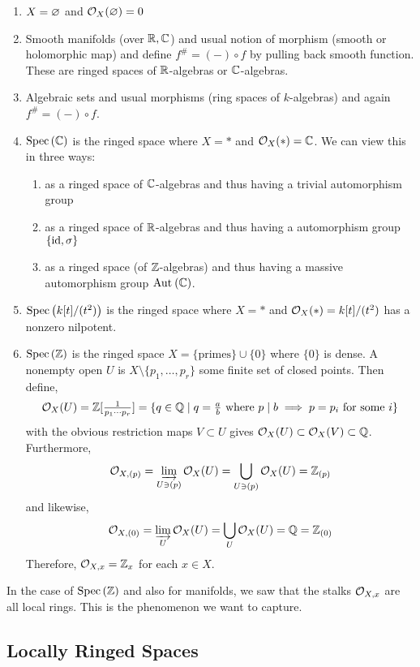 \documentclass[12pt]{article}
\begin{document}
\begin{enumerate}
\item $X = \varnothing$ and $\mathcal{O}_{X}(\varnothing) = 0$
\item Smooth manifolds (over $\mathbb{R}, \mathbb{C}$) and usual notion of morphism (smooth or holomorphic map) and define $f^\# = (-) \circ f$ by pulling back smooth function. These are ringed spaces of $\mathbb{R}$-algebras or $\mathbb{C}$-algebras.
\item Algebraic sets and usual morphisms (ring spaces of $k$-algebras) and again $f^\# = (-) \circ f$.
\item $\mathrm{Spec}\left( \mathbb{C} \right)$ is the ringed space where $X = *$ and $\mathcal{O}_{X}(*) = \mathbb{C}$. We can view this in three ways:
\begin{enumerate}
\item as a ringed space of $\mathbb{C}$-algebras and thus having a trivial automorphism group
\item as a ringed space of $\mathbb{R}$-algebras and thus having a automorphism group $\{ \mathrm{id}, \sigma \}$
\item as a ringed space (of $\mathbb{Z}$-algebras) and thus having a massive automorphism group $\mathrm{Aut}_{} \left( \mathbb{C} \right)$.
\end{enumerate}
\item $\mathrm{Spec}\left( k[t]/(t^2) \right)$ is the ringed space where $X = *$ and $\mathcal{O}_{X}(*) = k[t]/(t^2)$ has a nonzero nilpotent. 
\item $\mathrm{Spec}\left( \mathbb{Z} \right)$ is the ringed space $X = \{ \text{primes} \} \cup \{ 0 \}$ where $\{ 0 \}$ is dense. A nonempty open $U$ is $X \setminus \{ p_1, \dots, p_r \}$ some finite set of closed points. Then define,
\[ \mathcal{O}_{X}(U) = \mathbb{Z} [ \tfrac{1}{p_1 \cdots p_r} ] = \{ q \in \mathbb{Q} \mid q = \tfrac{a}{b} \text{ where } p \mid b \implies p = p_i \text{ for some } i \} \]
with the obvious restriction maps $V \subset U$ gives $\mathcal{O}_{X}(U) \subset \mathcal{O}_{X}(V) \subset \mathbb{Q}$. Furthermore,
\[ \mathcal{O}_{X, (p)} = \varinjlim_{U \ni (p)} \mathcal{O}_{X}(U) = \bigcup_{U \ni (p)} \mathcal{O}_{X}(U) = \mathbb{Z}_{(p)} \]
and likewise,
\[ \mathcal{O}_{X, (0)} = \varinjlim_{U} \mathcal{O}_{X}(U) = \bigcup_{U} \mathcal{O}_{X}(U) = \mathbb{Q} = \mathbb{Z}_{(0)} \]
Therefore, $\mathcal{O}_{X, x} = \mathbb{Z}_{x}$ for each $x \in X$.
\end{enumerate}

\begin{rmk}
In the case of $\mathrm{Spec}\left( \mathbb{Z} \right)$ and also for manifolds, we saw that the stalks $\mathcal{O}_{X, x}$ are all local rings. This is the phenomenon we want to capture.
\end{rmk}

\subsection{Locally Ringed Spaces}
\end{document}
